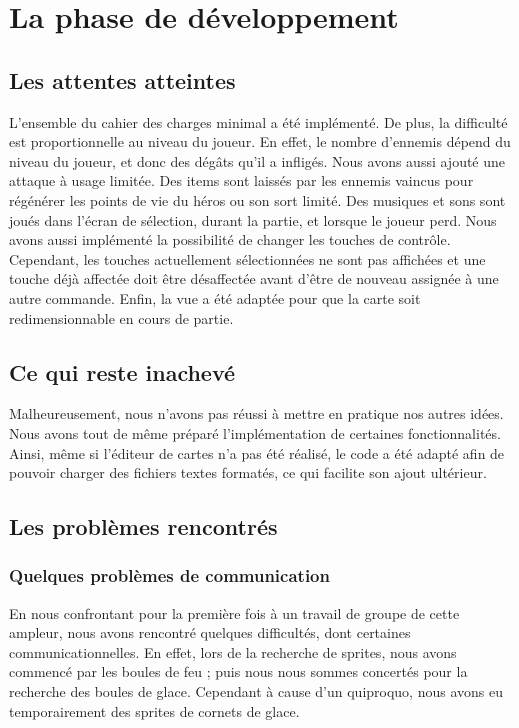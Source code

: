 \section{La phase de développement}

\subsection{Les attentes atteintes}

L'ensemble du cahier des charges minimal a été implémenté. De plus, la difficulté est proportionnelle au niveau du joueur. En effet, le nombre d'ennemis dépend du niveau du joueur, et donc des dégâts qu'il a infligés. Nous avons aussi ajouté une attaque à usage limitée. Des items sont laissés par les ennemis vaincus pour régénérer les points de vie du héros ou son sort limité. Des musiques et sons sont joués dans l'écran de sélection, durant la partie, et lorsque le joueur perd. Nous avons aussi implémenté la possibilité de changer les touches de contrôle. Cependant, les touches actuellement sélectionnées ne sont pas affichées et une touche déjà affectée doit être désaffectée avant d'être de nouveau assignée à une autre commande. Enfin, la vue a été adaptée pour que la carte soit redimensionnable en cours de partie. 

\subsection{Ce qui reste inachevé}

Malheureusement, nous n'avons pas réussi à mettre en pratique nos autres idées. Nous avons tout de même préparé l'implémentation de certaines fonctionnalités. Ainsi, même si l'éditeur de cartes n'a pas été réalisé, le code a été adapté afin de pouvoir charger des fichiers textes formatés, ce qui facilite son ajout ultérieur. 

\subsection{Les problèmes rencontrés}

	\subsubsection{Quelques problèmes de communication}
 
En nous confrontant pour la première fois à un travail de groupe de cette ampleur, nous avons rencontré quelques difficultés, dont certaines communicationnelles. En effet, lors de la recherche de sprites, nous avons commencé par les boules de feu ; puis nous nous sommes concertés pour la recherche des boules de glace. Cependant à cause d'un quiproquo, nous avons eu temporairement des sprites de cornets de glace.


